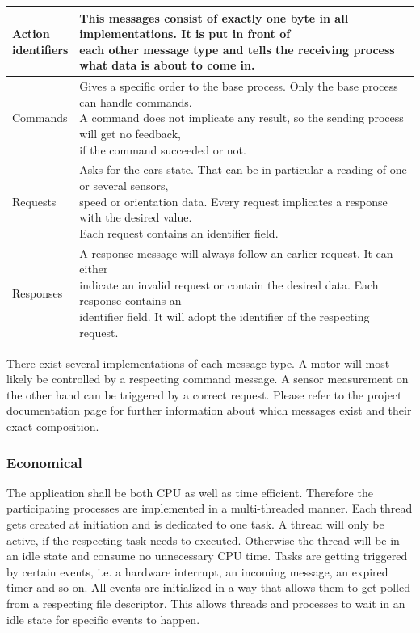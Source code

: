 \begingroup
\begin{tabular}[t]{|l|l|}
\hline
\makecell{Action\\identifiers} & \makecell{This messages consist of exactly one byte in all implementations. It is put in front of\\each other message type and tells the receiving process what data is about to come in.}\\
\hline
Commands & \makecell{Gives a specific order to the base process. Only the base process can handle commands.\\A command does not implicate any result, so the sending process will get no feedback,\\if the command succeeded or not.}\\
\hline
Requests & \makecell{Asks for the cars state. That can be in particular a reading of one or several sensors,\\speed or orientation data. Every request implicates a response with the desired value.\\Each request contains an identifier field.}\\
\hline
Responses & \makecell{A response message will always follow an earlier request. It can either\\indicate an invalid request or contain the desired data. Each response contains an\\identifier field. It will adopt the identifier of the respecting request.}\\
\hline
\end{tabular}
\label{tbl:message_definition}
\endgroup

\newpage

There exist several implementations of each message type. A motor will most likely be controlled by a respecting command message. A sensor measurement on the other hand can be triggered by a correct request. Please refer to the project documentation page \cite{docu} for further information about which messages exist and their exact composition.

\subsubsection{Economical}

The application shall be both CPU as well as time efficient. Therefore the participating processes are implemented in a multi-threaded manner. Each thread gets created at initiation and is dedicated to one task. A thread will only be active, if the respecting task needs to executed. Otherwise the thread will be in an idle state and consume no unnecessary CPU time. Tasks are getting triggered by certain events, i.e. a hardware interrupt, an incoming message, an expired timer and so on. All events are initialized in a way that allows them to get polled from a respecting file descriptor. This allows threads and processes to wait in an idle state for specific events to happen.\\

